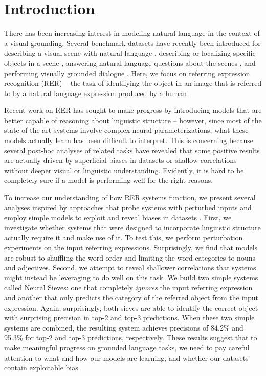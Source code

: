 \documentclass[11pt,a4paper]{article}
\begin{document}
\section{Introduction} 
\label{sec:introduction}
There has been increasing interest in modeling natural language in the context of a visual grounding. Several benchmark datasets have recently been introduced for describing a visual scene with natural language \cite{chen2015microsoft}, describing or localizing specific objects in a scene \cite{KazemzadehOrdonezMattenBergEMNLP14,mao2016generation}, answering natural language questions about the scenes \cite{antol2015vqa}, and performing visually grounded dialogue \cite{das2016visual}. Here, we focus on referring expression recognition (RER) -- the task of identifying the object in an image that is referred to by a natural language expression produced by a human \cite{KazemzadehOrdonezMattenBergEMNLP14,mao2016generation,hu2016natural,rohrbach2016grounding,yu2016modeling,nagaraja16refexp,hu2017modeling,cirik2018using}.

Recent work on RER has sought to make progress by introducing models that are better capable of reasoning about linguistic structure \cite{hu2017modeling,nagaraja16refexp} -- however, since most of the state-of-the-art systems involve complex neural parameterizations, what these models actually learn has been difficult to interpret.
This is concerning because several post-hoc analyses of related tasks \cite{zhou2015simple,devlin2015exploring,agrawal2016analyzing,jabri2016revisiting,goyal2016making} have revealed that some positive results are actually driven by superficial biases in datasets or shallow correlations without deeper visual or linguistic understanding. 
Evidently, it is hard to be completely sure if a model is performing well for the right reasons.

To increase our understanding of how RER systems function, we present several analyses inspired by approaches that probe systems with perturbed inputs \cite{jia2017adversarial} and employ simple models to exploit and reveal biases in datasets \cite{chen2016thorough}.
First, we investigate whether systems that were designed to incorporate linguistic structure actually require it and make use of it.
To test this, we perform perturbation experiments on the input referring expressions.
Surprisingly, we find that models are robust to shuffling the word order and limiting the word categories to nouns and adjectives.
Second, we attempt to reveal shallower correlations that systems might instead be leveraging to do well on this task. We build two simple systems called Neural Sieves: one that completely \textit{ignores} the input referring expression and another that only predicts the category of the referred object from the input expression.
Again, surprisingly, both sieves are able to identify the correct object with surprising precision in top-2 and top-3 predictions.
When these two simple systems are combined, the resulting system achieves precisions of 84.2\% and 95.3\% for top-2 and top-3 predictions, respectively.
These results suggest that to make meaningful progress on grounded language tasks, we need to pay careful attention to what and how our models are learning, and whether our datasets contain exploitable bias.
\vspace{-5pt}
\end{document}
